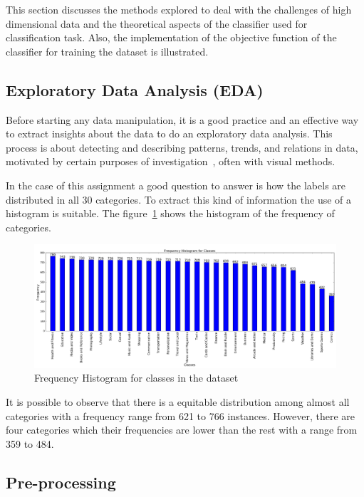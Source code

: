\documentclass[letterpaper,10pt]{article}
\theoremstyle{mytheor}
\begin{document}
This section discusses the methods explored to deal with the challenges of high dimensional data and the theoretical aspects of the classifier used for classification task. Also, the implementation of the objective function of the classifier for training the dataset is illustrated.

\subsection{Exploratory Data Analysis (EDA)}

Before starting any data manipulation, it is a good practice and an effective way to extract insights about the data to do an exploratory data analysis. This process is about detecting and describing patterns, trends, and relations in data, motivated by certain purposes of investigation~\cite{andrienko2006exploratory}, often with visual methods. 

In the case of this assignment a good question to answer is how the labels are distributed in all 30 categories. To extract this kind of information the use of a histogram is suitable. The figure~\ref{fig:2} shows the histogram of the frequency of categories.

\begin{figure}[H]
\includegraphics[width=\textwidth]{histo}
\centering
\caption{Frequency Histogram for classes in the dataset}
\label{fig:2}
\end{figure}

It is possible to observe that there is a equitable distribution among almost all categories with a frequency range from 621 to 766 instances. However, there are four categories which their frequencies are lower than the rest with a range from 359 to 484.

\subsection{Pre-processing}
\end{document}
